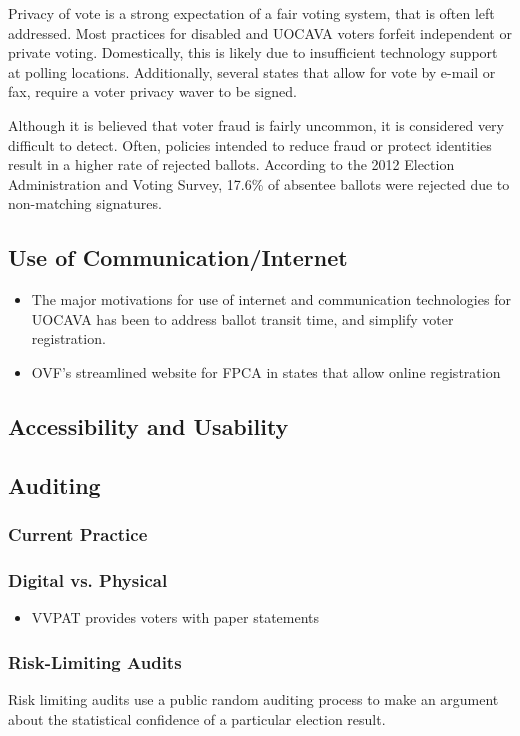 Privacy of vote is a strong expectation of a fair voting system, that is often left addressed. Most practices for disabled and UOCAVA voters forfeit independent or private voting. Domestically, this is likely due to insufficient technology support at polling locations. Additionally, several states that allow for vote by e-mail or fax, require a voter privacy waver to be signed.

Although it is believed that voter fraud is fairly uncommon, it is considered very difficult to detect. Often, policies intended to reduce fraud or protect identities result in a higher rate of rejected ballots. According to the 2012 Election Administration and Voting Survey, 17.6\% of absentee ballots were rejected due to non-matching signatures.

\subsection{Use of Communication/Internet}

\begin{itemize}
\item The major motivations for use of internet and communication technologies for UOCAVA has been to address ballot transit time, and simplify voter registration. 
\item OVF's streamlined website for FPCA in states that allow online registration
\end{itemize}

\subsection{Accessibility and Usability}
\subsection{Auditing}
\subsubsection{Current Practice}
\subsubsection{Digital vs. Physical}
\begin{itemize}
\item VVPAT provides voters with paper statements
\end{itemize}
\subsubsection{Risk-Limiting Audits}
Risk limiting audits use a public random auditing process to make an argument about the statistical confidence of a particular election result.

